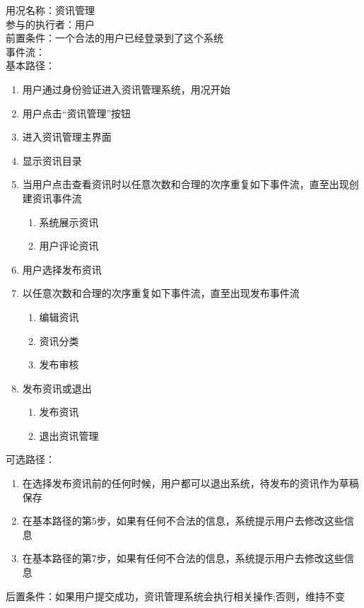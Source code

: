 \begin{framed}
\noindent
用况名称：资讯管理\\
参与的执行者：用户\\
前置条件：一个合法的用户已经登录到了这个系统\\
事件流：\\
基本路径：
\begin{enumerate}[itemsep=2pt,topsep=0pt,parsep=0pt,itemindent=1em]
    \item 用户通过身份验证进入资讯管理系统，用况开始
    \item 用户点击“资讯管理”按钮
    \item 进入资讯管理主界面
    \item 显示资讯目录
    \item 当用户点击查看资讯时以任意次数和合理的次序重复如下事件流，直至出现创建资讯事件流
    \begin{enumerate}[itemsep=2pt,topsep=0pt,parsep=0pt,itemindent=1em]
          \item 系统展示资讯
          \item 用户评论资讯
      \end{enumerate}
    \item 用户选择发布资讯
    \item 以任意次数和合理的次序重复如下事件流，直至出现发布事件流
    \begin{enumerate}[itemsep=2pt,topsep=0pt,parsep=0pt,itemindent=1em]
          \item 编辑资讯
          \item 资讯分类
          \item 发布审核
      \end{enumerate}
    \item 发布资讯或退出
        \begin{enumerate}[itemsep=2pt,topsep=0pt,parsep=0pt,itemindent=1em]
          \item 发布资讯
          \item 退出资讯管理
      \end{enumerate}
\end{enumerate}
\noindent
可选路径：\par
   \begin{enumerate}[itemsep=2pt,topsep=0pt,parsep=0pt,itemindent=1em]  \item 在选择发布资讯前的任何时候，用户都可以退出系统，待发布的资讯作为草稿保存 \item 在基本路径的第$5$步，如果有任何不合法的信息，系统提示用户去修改这些信息\item 在基本路径的第$7$步，如果有任何不合法的信息，系统提示用户去修改这些信息  \end{enumerate} 
后置条件：如果用户提交成功，资讯管理系统会执行相关操作;否则，维持不变
\end{framed}

